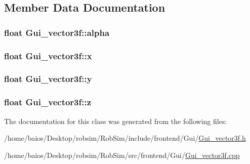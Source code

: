 \subsection{Member Data Documentation}
\hypertarget{class_gui__vector3f_af93c521b147e54d6b50f6612927e5d90}{
\subsubsection[{alpha}]{\setlength{\rightskip}{0pt plus 5cm}float Gui\-\_\-vector3f\-::alpha}}\label{class_gui__vector3f_af93c521b147e54d6b50f6612927e5d90}
\hypertarget{class_gui__vector3f_a023856935269d19fbe9e4e2405c4a330}{
\subsubsection[{x}]{\setlength{\rightskip}{0pt plus 5cm}float Gui\-\_\-vector3f\-::x}}\label{class_gui__vector3f_a023856935269d19fbe9e4e2405c4a330}
\hypertarget{class_gui__vector3f_aeeb2c025e216e05450ccc0516a31339c}{
\subsubsection[{y}]{\setlength{\rightskip}{0pt plus 5cm}float Gui\-\_\-vector3f\-::y}}\label{class_gui__vector3f_aeeb2c025e216e05450ccc0516a31339c}
\hypertarget{class_gui__vector3f_a36f4373054963a96e658d27b00ccc281}{
\subsubsection[{z}]{\setlength{\rightskip}{0pt plus 5cm}float Gui\-\_\-vector3f\-::z}}\label{class_gui__vector3f_a36f4373054963a96e658d27b00ccc281}


The documentation for this class was generated from the following files\-:\begin{DoxyCompactItemize}
\item 
/home/baios/\-Desktop/robsim/\-Rob\-Sim/include/frontend/\-Gui/\hyperlink{_gui__vector3f_8h}{Gui\-\_\-vector3f.\-h}\item 
/home/baios/\-Desktop/robsim/\-Rob\-Sim/src/frontend/\-Gui/\hyperlink{_gui__vector3f_8cpp}{Gui\-\_\-vector3f.\-cpp}\end{DoxyCompactItemize}
